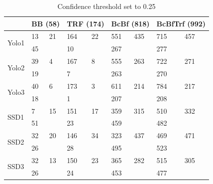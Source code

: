 \begin{table}[h!]
\centering
\begin{tabular}{l|ll|ll|ll|ll}
                       & \multicolumn{2}{l|}{BB (58)} & \multicolumn{2}{l|}{TRF (174)} & \multicolumn{2}{l|}{BcBf (818)} & \multicolumn{2}{l}{BcBfTrf (992)} \\ \hline
\multirow{2}{*}{Yolo1} & 13            & 21           & 164            & 22            & 551            & 435            & 715              & 457             \\
                       & 45            &              & 10             &               & 267            &                & 277              &                 \\ \hline

\multirow{2}{*}{Yolo2} & 39            & 4            & 167            & 8             & 555            & 263            & 722              & 271             \\
                       & 19            &              & 7              &               & 263            &                & 270              &                 \\ \hline
\multirow{2}{*}{Yolo3} & 40            & 6            & 173            & 3             & 611            & 214            & 784              & 217             \\
                       & 18            &              & 1              &               & 207            &                & 208              &                 \\ \hline
\multirow{2}{*}{SSD1}  & 7             & 15           & 151            & 17            & 359            & 315            & 510              & 332             \\
                       & 51            &              & 23             &               & 459            &                & 482              &                 \\ \hline
\multirow{2}{*}{SSD2}  & 32            & 20           & 146            & 34            & 323            & 437            & 469              & 471             \\
                       & 26            &              & 28             &               & 495            &                & 523              &                 \\ \hline

\multirow{2}{*}{SSD3}  & 32            & 13           & 150            & 23            & 365            & 282            & 515              & 305             \\
                       & 26            &              & 24             &               & 453            &                & 477              &                
\end{tabular}
\caption{Confidence threshold set to 0.25}
\end{table}



